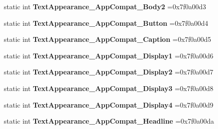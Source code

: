 \begin{DoxyCompactItemize}
static int {\bfseries Text\+Appearance\+\_\+\+App\+Compat\+\_\+\+Body2} =0x7f0a00d3
\item 
\mbox{\label{classandroid_1_1support_1_1graphics_1_1drawable_1_1R_1_1style_a1e1223172a853813e622ba46a908c95b}} 
static int {\bfseries Text\+Appearance\+\_\+\+App\+Compat\+\_\+\+Button} =0x7f0a00d4
\item 
\mbox{\label{classandroid_1_1support_1_1graphics_1_1drawable_1_1R_1_1style_a971b35021b1a19cc23d02e65b73035b2}} 
static int {\bfseries Text\+Appearance\+\_\+\+App\+Compat\+\_\+\+Caption} =0x7f0a00d5
\item 
\mbox{\label{classandroid_1_1support_1_1graphics_1_1drawable_1_1R_1_1style_a275f65ad9865557fc095bb7183f0f507}} 
static int {\bfseries Text\+Appearance\+\_\+\+App\+Compat\+\_\+\+Display1} =0x7f0a00d6
\item 
\mbox{\label{classandroid_1_1support_1_1graphics_1_1drawable_1_1R_1_1style_a28b992b9497a1eb2f7c9db2c38df6bcd}} 
static int {\bfseries Text\+Appearance\+\_\+\+App\+Compat\+\_\+\+Display2} =0x7f0a00d7
\item 
\mbox{\label{classandroid_1_1support_1_1graphics_1_1drawable_1_1R_1_1style_a36edf8df01e062ca760e7b5db5db25ca}} 
static int {\bfseries Text\+Appearance\+\_\+\+App\+Compat\+\_\+\+Display3} =0x7f0a00d8
\item 
\mbox{\label{classandroid_1_1support_1_1graphics_1_1drawable_1_1R_1_1style_ad5eba82864a01e4c7ea7be1870e83765}} 
static int {\bfseries Text\+Appearance\+\_\+\+App\+Compat\+\_\+\+Display4} =0x7f0a00d9
\item 
\mbox{\label{classandroid_1_1support_1_1graphics_1_1drawable_1_1R_1_1style_ab8ea65407ac447d4191d1c0b57621fb4}} 
static int {\bfseries Text\+Appearance\+\_\+\+App\+Compat\+\_\+\+Headline} =0x7f0a00da
\item 

\end{DoxyCompactItemize}
